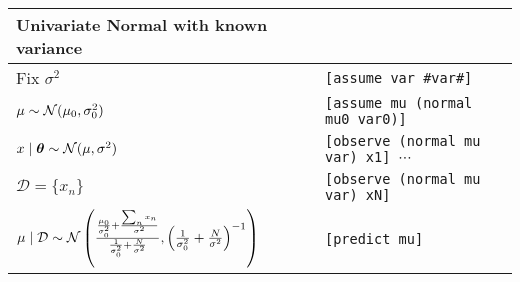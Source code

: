 \begin{table}[ht!]
\begin{tabular}{ll}
\toprule
Univariate Normal with known variance & \\
\midrule
Fix $\sigma^2$																		& \texttt{[assume var \#var\#]} \\
$\mu \sim \operatorname{\mathcal N}(\mu_0, \sigma_0^2)$												& \texttt{[assume mu (normal mu0 var0)]} \\
$x \mid \boldsymbol{\mathbf{\theta}} \sim \operatorname{\mathcal N}(\mu, \sigma^2)$										& \texttt{[observe (normal mu var) x1] $\cdots$} \\
$\mathcal D = \{x_n\}$																& \texttt{[observe (normal mu var) xN]} \\
$\mu \mid \mathcal D \sim \operatorname{\mathcal N}\left(\frac{\frac{\mu_0}{\sigma_0^2} + \frac{\sum_n x_n}{\sigma^2}}{\frac{1}{\sigma_0^2} + \frac{N}{\sigma^2}}, \left(\frac{1}{\sigma_0^2} + \frac{N}{\sigma^2}\right)^{-1}\right)$		& \texttt{[predict mu]} \\
\bottomrule
\end{tabular}
\end{table}

